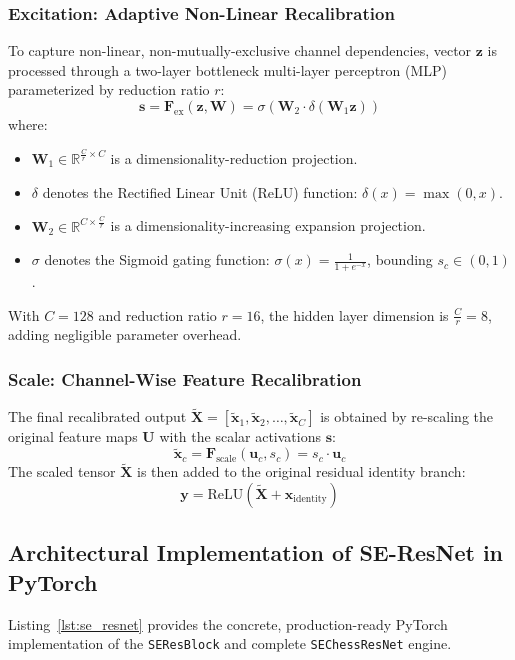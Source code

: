 \documentclass[10pt,journal,compsoc]{IEEEtran}
\begin{document}
\subsubsection{Excitation: Adaptive Non-Linear Recalibration}
To capture non-linear, non-mutually-exclusive channel dependencies, vector $\mathbf{z}$ is processed through a two-layer bottleneck multi-layer perceptron (MLP) parameterized by reduction ratio $r$:
\begin{equation}
\mathbf{s} = \mathbf{F}_{\text{ex}}(\mathbf{z}, \mathbf{W}) = \sigma\left(\mathbf{W}_2 \cdot \delta\left(\mathbf{W}_1 \mathbf{z}\right)\right)
\end{equation}
where:
\begin{itemize}
    \item $\mathbf{W}_1 \in \mathbb{R}^{\frac{C}{r} \times C}$ is a dimensionality-reduction projection.
    \item $\delta$ denotes the Rectified Linear Unit (ReLU) function: $\delta(x) = \max(0, x)$.
    \item $\mathbf{W}_2 \in \mathbb{R}^{C \times \frac{C}{r}}$ is a dimensionality-increasing expansion projection.
    \item $\sigma$ denotes the Sigmoid gating function: $\sigma(x) = \frac{1}{1 + e^{-x}}$, bounding $s_c \in (0, 1)$.
\end{itemize}
With $C = 128$ and reduction ratio $r = 16$, the hidden layer dimension is $\frac{C}{r} = 8$, adding negligible parameter overhead.

\subsubsection{Scale: Channel-Wise Feature Recalibration}
The final recalibrated output $\widetilde{\mathbf{X}} = [\tilde{\mathbf{x}}_1, \tilde{\mathbf{x}}_2, \dots, \tilde{\mathbf{x}}_C]$ is obtained by re-scaling the original feature maps $\mathbf{U}$ with the scalar activations $\mathbf{s}$:
\begin{equation}
\tilde{\mathbf{x}}_c = \mathbf{F}_{\text{scale}}(\mathbf{u}_c, s_c) = s_c \cdot \mathbf{u}_c
\end{equation}
The scaled tensor $\widetilde{\mathbf{X}}$ is then added to the original residual identity branch:
\begin{equation}
\mathbf{y} = \text{ReLU}\left(\widetilde{\mathbf{X}} + \mathbf{x}_{\text{identity}}\right)
\end{equation}

\subsection{Architectural Implementation of SE-ResNet in PyTorch}
Listing~\ref{lst:se_resnet} provides the concrete, production-ready PyTorch implementation of the \texttt{SEResBlock} and complete \texttt{SEChessResNet} engine.
\end{document}
